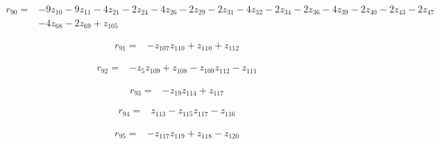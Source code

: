 \par\noindent\begin{minipage}{\linewidth}
\begin{align*}
r_{90}={}&-9z_{10}-9z_{11}-4z_{21}-2z_{24}-4z_{26}-2z_{29}-2z_{31}-4z_{32}-2z_{34}-2z_{36}-4z_{39}-2z_{40}-2z_{43}-2z_{47}\\[-2pt]
&-4z_{68}-2z_{69}+z_{105}
\end{align*}
\end{minipage}\par
\par\noindent\begin{minipage}{\linewidth}
\begin{align*}
r_{91}={}&-z_{107}z_{110}+z_{110}+z_{112}
\end{align*}
\end{minipage}\par
\par\noindent\begin{minipage}{\linewidth}
\begin{align*}
r_{92}={}&-z_{5}z_{109}+z_{108}-z_{109}z_{112}-z_{111}
\end{align*}
\end{minipage}\par
\par\noindent\begin{minipage}{\linewidth}
\begin{align*}
r_{93}={}&-z_{19}z_{114}+z_{117}
\end{align*}
\end{minipage}\par
\par\noindent\begin{minipage}{\linewidth}
\begin{align*}
r_{94}={}&z_{113}-z_{115}z_{117}-z_{116}
\end{align*}
\end{minipage}\par
\par\noindent\begin{minipage}{\linewidth}
\begin{align*}
r_{95}={}&-z_{117}z_{119}+z_{118}-z_{120}
\end{align*}
\end{minipage}\par
